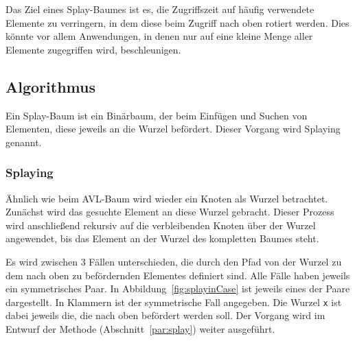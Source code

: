 Das Ziel eines Splay-Baumes ist es, die Zugriffszeit auf häufig verwendete Elemente zu verringern,
in dem diese beim Zugriff nach oben rotiert werden.
Dies könnte vor allem Anwendungen, in denen nur auf eine kleine Menge aller Elemente
zugegriffen wird, beschleunigen.

\subsection{Algorithmus}\label{subsec:splay-algorithmus}
Ein Splay-Baum ist ein Binärbaum, der beim Einfügen und Suchen von Elementen, diese jeweils an
die Wurzel befördert.
Dieser Vorgang wird Splaying genannt.

\subsubsection{Splaying}
Ähnlich wie beim AVL-Baum wird wieder ein Knoten als Wurzel betrachtet.
Zunächst wird das gesuchte Element an diese Wurzel gebracht.
Dieser Prozess wird anschließend rekursiv auf die verbleibenden Knoten über der Wurzel angewendet,
bis das Element an der Wurzel des kompletten Baumes steht.

Es wird zwischen 3 Fällen unterschieden, die durch den Pfad von der Wurzel zu dem nach oben
zu befördernden Elementes definiert sind.
Alle Fälle haben jeweils ein symmetrisches Paar.
In Abbildung~\ref{fig:splayinCase} ist jeweils eines der Paare dargestellt.
In Klammern ist der symmetrische Fall angegeben.
Die Wurzel \verb|x| ist dabei jeweils die, die nach oben befördert werden soll.
Der Vorgang wird im Entwurf der Methode  (Abschnitt~\ref{par:splay})
weiter ausgeführt.

